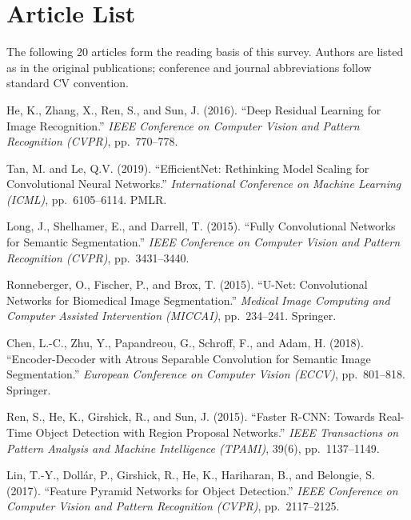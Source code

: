 \documentclass[12pt,a4paper]{article}
\begin{document}
\clearpage
\section{Article List}
\label{surv:sec:articles}

The following 20 articles form the reading basis of this survey. Authors are listed as in the original publications; conference and journal abbreviations follow standard CV convention.

\begin{enumerate}[leftmargin=*, label={[\arabic*]}]

  \item He, K., Zhang, X., Ren, S., and Sun, J. (2016). ``Deep Residual Learning for Image Recognition.'' \textit{IEEE Conference on Computer Vision and Pattern Recognition (CVPR)}, pp.\ 770--778.

  \item Tan, M. and Le, Q.V. (2019). ``EfficientNet: Rethinking Model Scaling for Convolutional Neural Networks.'' \textit{International Conference on Machine Learning (ICML)}, pp.\ 6105--6114. PMLR.

  \item Long, J., Shelhamer, E., and Darrell, T. (2015). ``Fully Convolutional Networks for Semantic Segmentation.'' \textit{IEEE Conference on Computer Vision and Pattern Recognition (CVPR)}, pp.\ 3431--3440.

  \item Ronneberger, O., Fischer, P., and Brox, T. (2015). ``U-Net: Convolutional Networks for Biomedical Image Segmentation.'' \textit{Medical Image Computing and Computer Assisted Intervention (MICCAI)}, pp.\ 234--241. Springer.

  \item Chen, L.-C., Zhu, Y., Papandreou, G., Schroff, F., and Adam, H. (2018). ``Encoder-Decoder with Atrous Separable Convolution for Semantic Image Segmentation.'' \textit{European Conference on Computer Vision (ECCV)}, pp.\ 801--818. Springer.

  \item Ren, S., He, K., Girshick, R., and Sun, J. (2015). ``Faster R-CNN: Towards Real-Time Object Detection with Region Proposal Networks.'' \textit{IEEE Transactions on Pattern Analysis and Machine Intelligence (TPAMI)}, 39(6), pp.\ 1137--1149.

  \item Lin, T.-Y., Doll{\'a}r, P., Girshick, R., He, K., Hariharan, B., and Belongie, S. (2017). ``Feature Pyramid Networks for Object Detection.'' \textit{IEEE Conference on Computer Vision and Pattern Recognition (CVPR)}, pp.\ 2117--2125.


\end{enumerate}
\end{document}
